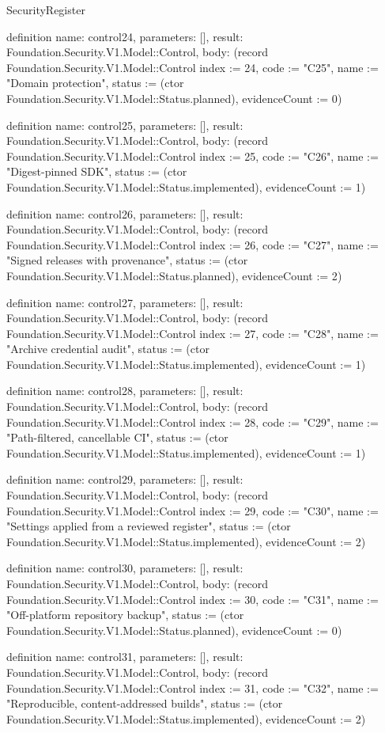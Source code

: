 \begin{lexlean}{SecurityRegister}
\begin{semanticmodule}
definition{
  name: control24,
  parameters: [],
  result: Foundation.Security.V1.Model::Control,
  body: (record Foundation.Security.V1.Model::Control {index := 24, code := "C25", name := "Domain protection", status := (ctor Foundation.Security.V1.Model::Status.planned), evidenceCount := 0})
}

definition{
  name: control25,
  parameters: [],
  result: Foundation.Security.V1.Model::Control,
  body: (record Foundation.Security.V1.Model::Control {index := 25, code := "C26", name := "Digest-pinned SDK", status := (ctor Foundation.Security.V1.Model::Status.implemented), evidenceCount := 1})
}

definition{
  name: control26,
  parameters: [],
  result: Foundation.Security.V1.Model::Control,
  body: (record Foundation.Security.V1.Model::Control {index := 26, code := "C27", name := "Signed releases with provenance", status := (ctor Foundation.Security.V1.Model::Status.planned), evidenceCount := 2})
}

definition{
  name: control27,
  parameters: [],
  result: Foundation.Security.V1.Model::Control,
  body: (record Foundation.Security.V1.Model::Control {index := 27, code := "C28", name := "Archive credential audit", status := (ctor Foundation.Security.V1.Model::Status.implemented), evidenceCount := 1})
}

definition{
  name: control28,
  parameters: [],
  result: Foundation.Security.V1.Model::Control,
  body: (record Foundation.Security.V1.Model::Control {index := 28, code := "C29", name := "Path-filtered, cancellable CI", status := (ctor Foundation.Security.V1.Model::Status.implemented), evidenceCount := 1})
}

definition{
  name: control29,
  parameters: [],
  result: Foundation.Security.V1.Model::Control,
  body: (record Foundation.Security.V1.Model::Control {index := 29, code := "C30", name := "Settings applied from a reviewed register", status := (ctor Foundation.Security.V1.Model::Status.implemented), evidenceCount := 2})
}

definition{
  name: control30,
  parameters: [],
  result: Foundation.Security.V1.Model::Control,
  body: (record Foundation.Security.V1.Model::Control {index := 30, code := "C31", name := "Off-platform repository backup", status := (ctor Foundation.Security.V1.Model::Status.planned), evidenceCount := 0})
}

definition{
  name: control31,
  parameters: [],
  result: Foundation.Security.V1.Model::Control,
  body: (record Foundation.Security.V1.Model::Control {index := 31, code := "C32", name := "Reproducible, content-addressed builds", status := (ctor Foundation.Security.V1.Model::Status.implemented), evidenceCount := 2})
}


\end{semanticmodule}
\end{lexlean}
